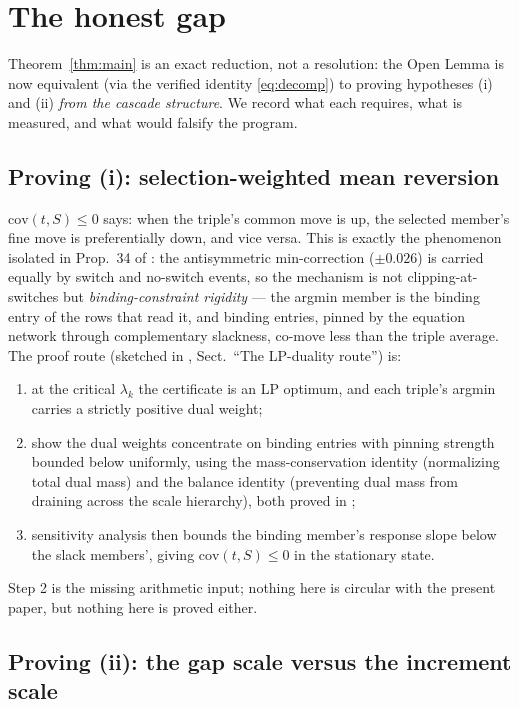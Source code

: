 \documentclass[11pt]{article}
\theoremstyle{definition}
\theoremstyle{remark}
\newcommand{\cov}{\mathrm{cov}}
\newcommand{\lam}{\lambda}
\begin{document}
\section{The honest gap}
\label{sec:gap}

Theorem~\ref{thm:main} is an exact reduction, not a resolution: the Open
Lemma is now equivalent (via the verified identity \eqref{eq:decomp}) to
proving hypotheses (i) and (ii) \emph{from the cascade structure}. We
record what each requires, what is measured, and what would falsify the
program.

\subsection{Proving (i): selection-weighted mean reversion}

$\cov(t, S) \leq 0$ says: when the triple's common move is up, the
selected member's fine move is preferentially down, and vice versa. This
is exactly the phenomenon isolated in Prop.~34 of \cite{NOTE}: the
antisymmetric min-correction ($\pm 0.026$) is carried equally by switch
and no-switch events, so the mechanism is not clipping-at-switches but
\emph{binding-constraint rigidity} --- the argmin member is the binding
entry of the rows that read it, and binding entries, pinned by the
equation network through complementary slackness, co-move less than the
triple average. The proof route (sketched in \cite{Drift26},
Sect.~``The LP-duality route'') is:
\begin{enumerate}
\item at the critical $\lam_k$ the certificate is an LP optimum, and
each triple's argmin carries a strictly positive dual weight;
\item show the dual weights concentrate on binding entries with pinning
strength bounded below uniformly, using the mass-conservation identity
(normalizing total dual mass) and the balance identity (preventing dual
mass from draining across the scale hierarchy), both proved in
\cite{Drift26};
\item sensitivity analysis then bounds the binding member's response
slope below the slack members', giving $\cov(t, S) \leq 0$ in the
stationary state.
\end{enumerate}
Step 2 is the missing arithmetic input; nothing here is circular with
the present paper, but nothing here is proved either.

\subsection{Proving (ii): the gap scale versus the increment scale}
\end{document}
